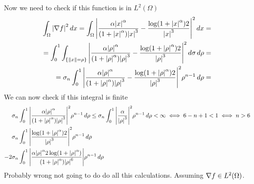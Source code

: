 Now we need to check if this function is in \(L^2(\Omega)\)
\[
    \begin{split}
        \int_\Omega \abs{\nabla f}^2 \, dx = \int_\Omega \abs{\frac{\alpha\abs{x}^{\alpha}}{(1 + \abs{x}^\alpha)\abs{x}^3} - \frac{\log(1 + \abs{x}^\alpha)2}{\abs{x}^3}}^2 \, dx = \\
        = \int_0^1 \int_{\left\{\norm{x} = \rho\right\}} \abs{\frac{\alpha\abs{\rho}^{\alpha}}{(1 + \abs{\rho}^\alpha)\abs{\rho}^3} - \frac{\log(1 + \abs{\rho}^\alpha)2}{\abs{\rho}^3}}^2 \, d\sigma \, d\rho =\\
        =\sigma_n \int_0^1 \abs{\frac{\alpha\abs{\rho}^{\alpha}}{(1 + \abs{\rho}^\alpha)\abs{\rho}^3} - \frac{\log(1 + \abs{\rho}^\alpha)2}{\abs{\rho}^3}}^2 \rho^{n-1} \, d\rho = \\
    \end{split}
\]
We can now check if this integral is finite
\begin{align*}
    \sigma_n &\int_0^1 \abs{\frac{\alpha\abs{\rho}^{\alpha}}{(1 + \abs{\rho}^\alpha)\abs{\rho}^3}}^2 \rho^{n-1} \, d\rho \leq \sigma_n \int_0^1 \abs{\frac{\alpha}{\abs{\rho}^3}}^2 \rho^{n-1} \, d\rho < \infty \iff 6 - n +1 < 1 \iff n > 6  \\
    \sigma_n &\int_0^1 \abs{\frac{\log(1 + \abs{\rho}^\alpha)2}{\abs{\rho}^3}}^2 \rho^{n-1} \, d\rho \\
    -2\sigma_n &\int_0^1 \abs{\frac{\alpha\abs{\rho}^{\alpha}2\log(1 + \abs{\rho}^\alpha)}{(1 + \abs{\rho}^\alpha)\abs{\rho}^6}} \rho^{n-1} \, d\rho
\end{align*}
Probably wrong not going to do do all this calculations. Assuming \(\nabla f \in L^2(\Omega)\).


